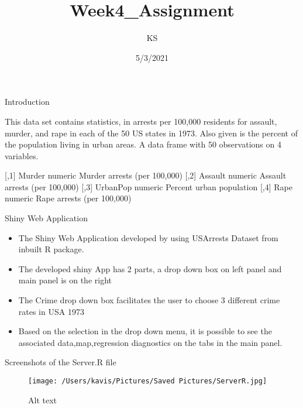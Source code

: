 \documentclass[
  ignorenonframetext,
]{beamer}
\title{Week4\_Assignment}
\author{KS}
\date{5/3/2021}
\providecommand{\tightlist}{%
  \setlength{\itemsep}{0pt}\setlength{\parskip}{0pt}}
\begin{document}
\frame{\titlepage}

\begin{frame}{Introduction}
\protect\hypertarget{introduction}{}

This data set contains statistics, in arrests per 100,000 residents for
assault, murder, and rape in each of the 50 US states in 1973. Also
given is the percent of the population living in urban areas. A data
frame with 50 observations on 4 variables.

{[},1{]} Murder numeric Murder arrests (per 100,000) {[},2{]} Assault
numeric Assault arrests (per 100,000) {[},3{]} UrbanPop numeric Percent
urban population {[},4{]} Rape numeric Rape arrests (per 100,000)

\end{frame}

\begin{frame}{Shiny Web Application}
\protect\hypertarget{shiny-web-application}{}

\begin{itemize}
\tightlist
\item
  The Shiny Web Application developed by using USArrests Dataset from
  inbuilt R package.
\item
  The developed shiny App has 2 parts, a drop down box on left panel and
  main panel is on the right
\item
  The Crime drop down box facilitates the user to choose 3 different
  crime rates in USA 1973
\item
  Based on the selection in the drop down menu, it is possible to see
  the associated data,map,regression diagnostics on the tabs in the main
  panel.
\end{itemize}

Screenshots of the Server.R file

\begin{figure}
\centering
\texttt{[image: /Users/kavis/Pictures/Saved Pictures/ServerR.jpg]}
\caption{Alt text}
\end{figure}

\end{frame}
\end{document}
